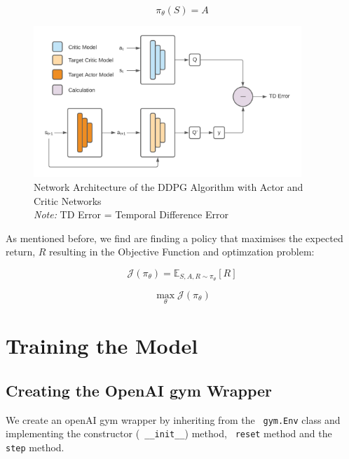 \documentclass{article}
\begin{document}
\[ \pi_{\theta}(S) = A \]

\begin{figure}[h]
    \centering
    \includegraphics[width=0.9\textwidth]{DDPG.png}
    \caption{Network Architecture of the DDPG Algorithm with Actor and Critic Networks \\ \emph{Note:} TD Error = Temporal Difference Error}
\end{figure}


As mentioned before, we find are finding a policy that maximises the expected return, \(R\) resulting in the Objective Function and optimzation problem: 

\begin{equation} 
    \mathcal{J}(\pi_{\theta}) = \mathbb{E}_{S, A, R \sim \pi_{\theta}} \left[ R \right] \end{equation}

\begin{equation} 
    \max_{\theta}\mathcal{J}(\pi_{\theta})
\end{equation}





\pagebreak

\section{Training the Model}
\subsection{Creating the OpenAI gym Wrapper}

We create an openAI gym wrapper by inheriting from the \lstinline{ gym.Env} class and implementing the constructor (\lstinline{ __init__}) method, \lstinline{ reset} method and the \lstinline{ step} method. 
\end{document}

